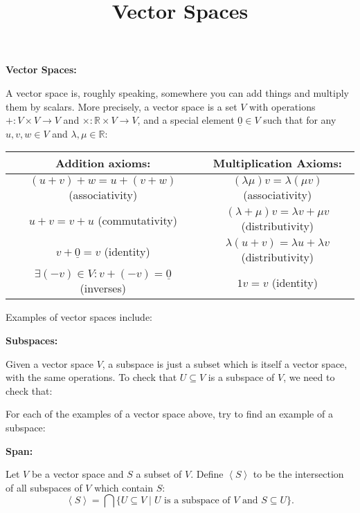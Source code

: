 \documentclass{article}
\newcommand{\SP}[1]{\left\langle #1 \right\rangle}
\newcommand{\mybox}[1]{\begin{minipage}{0.45\textwidth} \medskip #1 \medskip \end{minipage}}
\let\uline\underline
\begin{document}
\title{Vector Spaces}
\date{}

\maketitle
\thispagestyle{empty}

\Large

\textbf{Vector Spaces:}\bigskip

A vector space is, roughly speaking, somewhere you can add things and multiply them by scalars. More precisely, a vector space is a set $V$ with operations $+:V\times V\to V$ and $\times :\mathbb{R}\times V\to V$, and a special element $\uline{0}\in V$ such that for any $u,v,w\in V$ and $\lambda,\mu\in\mathbb{R}$:\medskip

\noindent\begin{tabular}{c|c}
	\textbf{Addition axioms:} & \textbf{Multiplication Axioms:}\\ \hline
	\mybox{$(u+v)+w=u+(v+w)$ (associativity)} & \mybox{$(\lambda \mu)v=\lambda(\mu v)$ (associativity)}\\ \hline
	\mybox{$u+v=v+u$ (commutativity)} & \mybox{$(\lambda+\mu)v=\lambda v+\mu v$ (distributivity)}\\ \hline
	\mybox{$v+\uline{0}=v$ (identity)} & \mybox{$\lambda(u+v)=\lambda u +\lambda v$ (distributivity)}\\ \hline
	\mybox{$\exists (-v)\in V: v+(-v)=\uline{0}$ (inverses)} & \mybox{$1v=v$ (identity)}
\end{tabular}\medskip

Examples of vector spaces include:

\vfill

\clearpage


\textbf{Subspaces:}\bigskip

Given a vector space $V$, a subspace is just a subset which is itself a vector space, with the same operations. To check that $U\subseteq V$ is a subspace of $V$, we need to check that:
\vfill


For each of the examples of a vector space above, try to find an example of a subspace:
\vfill


\clearpage

\textbf{Span:}\bigskip


Let $V$ be a vector space and $S$ a subset of $V$. Define $\SP{S}$ to be the intersection of all subspaces of $V$ which contain $S$:
\[\SP{S}=\bigcap\{U\subseteq V\mid \mbox{$U$ is a subspace of $V$ and }S\subseteq U\}.\]
\end{document}

